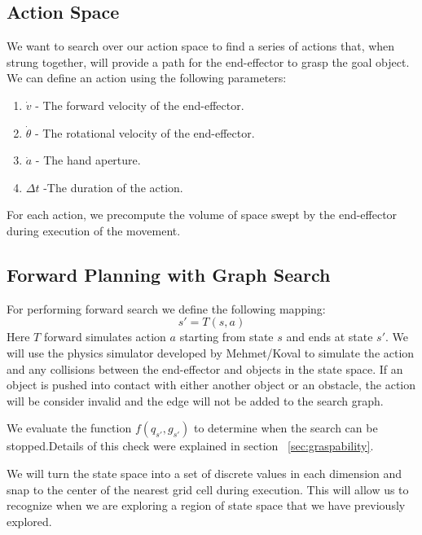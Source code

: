 \documentclass[11pt, oneside]{article}   	%
\begin{document}
\subsection*{Action Space}
We want to search over our action space to find a series of actions that, when strung together, will provide a path for the end-effector to grasp the goal object.  We can define an action using the following parameters:
\begin{enumerate}
\item $\dot{v}$ -  The forward velocity of the end-effector.
\item $\dot{\theta}$ - The rotational velocity of the end-effector.
\item $\dot{a}$ - The hand aperture.
\item $\Delta t$ -The duration of the action.
\end{enumerate}
For each action, we precompute the volume of space swept by the end-effector during execution of the movement.  

\subsection*{Forward Planning with Graph Search}
For performing forward search we define the following mapping:
\[ s' = T(s, a) \]
Here $T$ forward simulates action $a$ starting from state $s$ and ends at state $s'$. We will use the physics simulator developed by Mehmet/Koval to simulate the action and any collisions between the end-effector and objects in the state space.  If an object is pushed into contact with either another object or an obstacle, the action will be consider invalid and the edge will not be added to the search graph.

We evaluate the function $f(q_{s'}, g_{s'})$ to determine when the search can be stopped.Details of this check were explained in section ~\ref{sec:graspability}.

We will turn the state space into a set of discrete values in each dimension and snap to the center of the nearest grid cell during execution.   This will allow us to recognize when we are exploring a region of state space that we have previously explored.  
\end{document}
